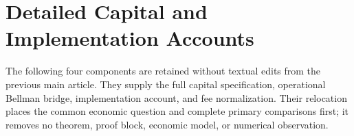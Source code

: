 \section{Detailed Capital and Implementation Accounts}\label{app:r19retained}
The following four components are retained without textual edits from the
previous main article. They supply the full capital specification, operational
Bellman bridge, implementation account, and fee normalization. Their relocation
places the common economic question and complete primary comparisons first;
it removes no theorem, proof block, economic model, or numerical observation.




